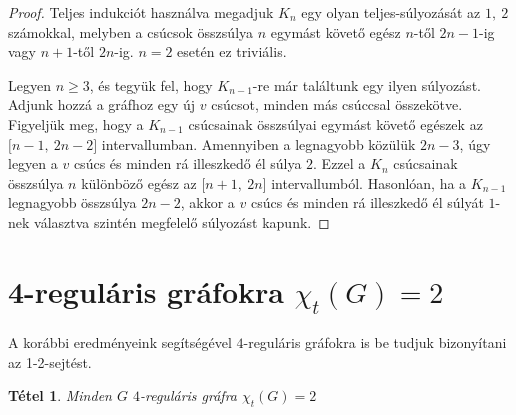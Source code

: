 \documentclass[12pt, a4paper]{report}
\newtheorem{tét}{Tétel}[section]
\theoremstyle{remark}
\theoremstyle{definition}
\begin{document}
\begin{proof}
Teljes indukciót használva megadjuk $K_n$ egy olyan teljes-súlyozását az $1,\ 2$ számokkal, melyben a csúcsok összsúlya $n$ egymást követő egész $n$-től $2n - 1$-ig vagy $n + 1$-től $2n$-ig. $n = 2$ esetén ez triviális.

Legyen $n \geq 3$, és tegyük fel, hogy $K_{n - 1}$-re már találtunk egy ilyen súlyozást. Adjunk hozzá a gráfhoz egy új $v$ csúcsot, minden más csúccsal összekötve. Figyeljük meg, hogy a $K_{n - 1}$ csúcsainak összsúlyai egymást követő egészek az $\lbrack n - 1,\ 2n - 2 \rbrack$ intervallumban. Amennyiben a legnagyobb közülük $2n - 3$, úgy legyen a $v$ csúcs és minden rá illeszkedő él súlya $2$. Ezzel a $K_n$ csúcsainak összsúlya $n$ különböző egész az $\lbrack n + 1,\ 2n \rbrack$ intervallumból. Hasonlóan, ha a $K_{n - 1}$ legnagyobb összsúlya $2n - 2$, akkor a $v$ csúcs és minden rá illeszkedő él súlyát $1$-nek választva szintén megfelelő súlyozást kapunk.
\end{proof}

\section{4-reguláris gráfokra $χ_t(G) = 2$}
A korábbi eredményeink segítségével $4$-reguláris gráfokra is be tudjuk bizonyítani az 1-2-sejtést.

\begin{tét}
Minden $G$ $4$-reguláris gráfra $\chi_t(G) = 2$
\end{tét}
\end{document}
